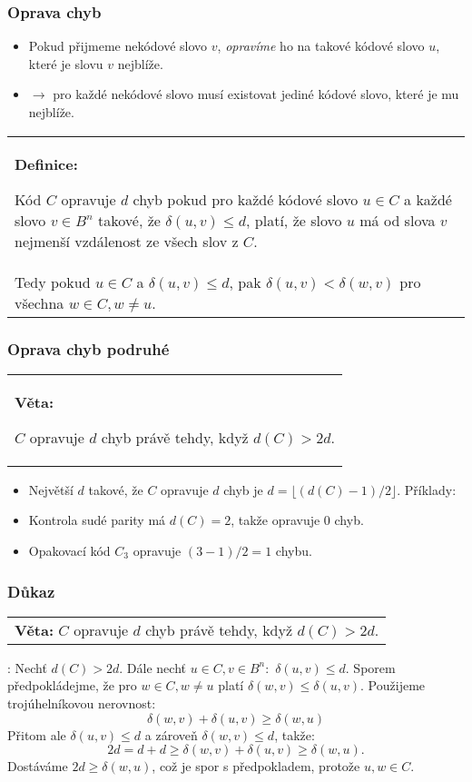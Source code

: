 \documentclass{beamer}
\newenvironment{definice}
{
    \begin{center}
    \begin{tabular}{p{9cm}}
    \textbf{Definice:}
}
{
    \end{tabular}
    \end{center}
}
\newenvironment{veta}
{
    \begin{center}
    \begin{tabular}{p{9cm}}
    \textbf{Věta:}
}
{
    \end{tabular}
    \end{center}
}
\newenvironment{itemizex}%
  {\large \begin{itemize}%
    \setlength{\itemsep}{8pt}%
    \setlength{\parskip}{8pt}}%
  {\end{itemize}}
\begin{document}
\begin{frame}[t,fragile]\frametitle{Oprava chyb} 
    \begin{itemizex}
        \item Pokud přijmeme nekódové slovo $v$, \textit{opravíme} ho na takové kódové slovo $u$, které je slovu $v$ nejblíže. 
        \item $\longrightarrow$ pro každé nekódové slovo musí existovat jediné kódové slovo, které je mu nejblíže. 
    \end{itemizex}

\begin{definice}
Kód $C$ opravuje $d$ chyb pokud pro každé kódové slovo $u\in C$ a každé slovo $v\in B^n$ takové, že $\delta(u, v) \le d$, platí, že slovo $u$ má od slova $v$ nejmenší vzdálenost ze všech slov z $C$. \\Tedy pokud $u\in C$ a $\delta(u,v)\le d$, pak $\delta(u,v)<\delta(w,v)$ pro všechna $w\in C, w\ne u$.
\end{definice}
\end{frame}


\begin{frame}[t,fragile]\frametitle{Oprava chyb podruhé} 
\begin{veta}
$C$ opravuje $d$ chyb právě tehdy, když $d(C)>2d$.
\end{veta}

\begin{itemizex}
    \item Největší $d$ takové, že $C$ opravuje $d$ chyb je $d=\lfloor(d(C)-1)/2\rfloor$. Příklady:
    \item Kontrola sudé parity má $d(C)=2$, takže opravuje 0 chyb. 
    \item Opakovací kód $C_3$ opravuje $(3-1)/2=1$ chybu.
\end{itemizex}
\end{frame}



\begin{frame}[t,fragile]\frametitle{Důkaz} 
\begin{veta}$C$ opravuje $d$ chyb právě tehdy, když $d(C)>2d$.\end{veta}
\uv{$\Leftarrow$}: Nechť $d(C)>2d$. Dále nechť $u\in C, v\in B^n:$ $\delta(u,v)\le d$. Sporem předpokládejme, že pro $w\in C, w\ne u$ platí $\delta(w,v)\le\delta(u,v)$. Použijeme trojúhelníkovou nerovnost:
$$
\delta(w,v)+\delta(u,v)\ge\delta(w,u)
$$
Přitom ale $\delta(u,v)\le d$ a zároveň $\delta(w,v)\le d$, takže:
$$
2d=d+d\ge\delta(w,v)+\delta(u,v)\ge\delta(w,u).
$$
Dostáváme $2d\ge\delta(w,u)$, což je spor s předpokladem, protože $u,w\in C$.
\end{frame}
\end{document}

